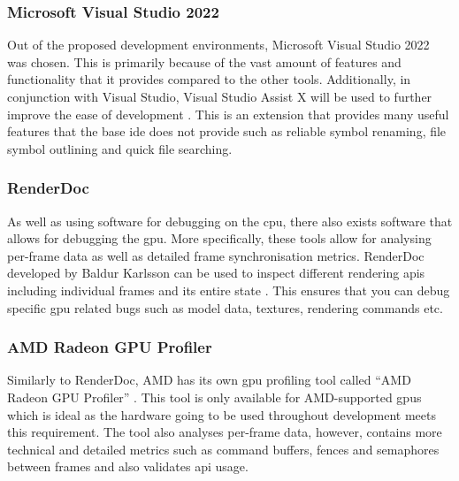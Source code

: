 \documentclass[11pt]{article}
\begin{document}
\subsubsection{Microsoft Visual Studio 2022} \label{development_environment}
Out of the proposed development environments, Microsoft Visual Studio 2022 was
chosen. This is primarily because of the vast amount of features and
functionality that it provides compared to the other tools. Additionally, in
conjunction with Visual Studio, Visual Studio Assist X will be used to further
improve the ease of development \cite{visualstudioassistx}. This is an extension
that provides many useful features that the base \gls*{ide} does not provide
such as reliable symbol renaming, file symbol outlining and quick file
searching.

\subsubsection{RenderDoc}
As well as using software for debugging on the \gls*{cpu}, there also exists
software that allows for debugging the \gls*{gpu}. More specifically, these
tools allow for analysing per-frame data as well as detailed frame
synchronisation metrics. RenderDoc developed by Baldur Karlsson can be used to
inspect different rendering \glspl*{api} including individual frames and its
entire state \cite{renderdoc}. This ensures that you can debug specific
\gls*{gpu} related bugs such as model data, textures, rendering commands etc.

\subsubsection{AMD Radeon GPU Profiler}
Similarly to RenderDoc, AMD has its own \gls*{gpu} profiling tool called ``AMD
Radeon GPU Profiler'' \cite{rgp}. This tool is only available for AMD-supported
\glspl*{gpu} which is ideal as the hardware going to be used throughout
development meets this requirement. The tool also analyses per-frame data,
however, contains more technical and detailed metrics such as command buffers,
fences and semaphores between frames and also validates \gls*{api} usage.

\end{document}
